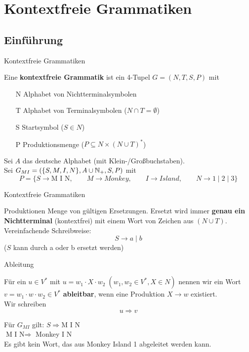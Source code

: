 \section{Kontextfreie Grammatiken}
\subsection{Einführung}
\begin{frame}{Kontextfreie Grammatiken}
	
	\begin{Definition}
		Eine \textbf{kontextfreie Grammatik} ist ein 4-Tupel $G = (N, T, S ,P)$ mit
		\begin{itemize}
			\item[N] Alphabet von Nichtterminalsymbolen
			\item[T] Alphabet von Terminalsymbolen ($N \cap T = \emptyset$)
			\item[S] Startsymbol ($S \in N$)
			\item[P] Produktionsmenge ($P \subseteq N \times (N \cup T)^\ast$)
		\end{itemize}
	\end{Definition}

	\pause
	\begin{Beispiel}
		Sei $A$ das deutsche Alphabet (mit Klein-/Großbuchstaben).\\
		Sei $G_{MI} = (\{S, M, I, N\}, A \cup \mathbb{N}_+, S, P)$ mit
		\[
			P = \{S \to \text{M I N}, \qquad M \to Monkey, \qquad I \to Island, \qquad N \to 1 \mid 2 \mid 3 \}
		\]
	\end{Beispiel}
\end{frame}

\begin{frame}{Kontextfreie Grammatiken}
	\begin{block}{Produktionen}
		Menge von gültigen Ersetzungen. Ersetzt wird immer \textbf{genau ein Nichtterminal} (kontextfrei) mit einem Wort von Zeichen aus $(N \cup T)$.\\
		\pause
		Vereinfachende Schreibweise: $$S \to a \mid b$$ ($S$ kann durch a oder b ersetzt werden)
	\end{block}
\end{frame}

\begin{frame}{Ableitung}
	\begin{Definition}
		Für ein  $u \in V^\ast$ mit $u = w_1 \cdot X \cdot w_2 \; (w_1, w_2 \in V^\ast, X \in N)$ nennen wir ein Wort $v = w_1 \cdot w \cdot w_2 \in V^\ast$ \textbf{ableitbar}, wenn eine Produktion $X \to w$ existiert.\\
		Wir schreiben $$u \Rightarrow v$$
	\end{Definition}
	
	\pause
	\begin{Beispiel}
		Für $G_{MI}$ gilt: $S \Rightarrow \text{M I N}$\\
		$ \text{M I N} \Rightarrow$ Monkey I N\\
		Es gibt kein Wort, das aus Monkey Island 1 abgeleitet werden kann.
	\end{Beispiel}
	
\end{frame}

